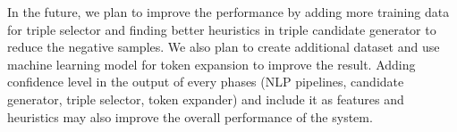 \documentclass[peerreview,12pt]{IEEEtran}
\begin{document}
In the future, we plan to improve the performance by adding more training data for triple selector and finding better heuristics in triple candidate generator to reduce the negative samples. We also plan to create additional dataset and use machine learning model for token expansion to improve the result. Adding confidence level in the output of every phases (NLP pipelines, candidate generator, triple selector, token expander) and include it as features and heuristics may also improve the overall performance of the system.






\end{document}
